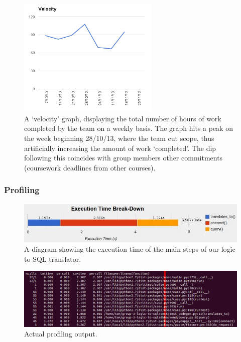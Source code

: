 \documentclass[a4paper, 11pt]{article}
\begin{document}
    \begin{figure}[H]
      \centering
      \includegraphics[width=0.6\textwidth]{images/velocity.png}
      \caption{A `velocity' graph, displaying the total number of hours of work
        completed by the team on a weekly basis. The graph hits a peak on the
        week beginning 28/10/13, where the team cut scope, thus artificially
        increasing the amount of work `completed'. The dip following this
        coincides with group members other commitments (coursework deadlines
        from other courses).}
      \end{figure}

  \subsubsection{Profiling}
     \begin{figure}[H]
        \includegraphics[width=1.0\textwidth]{images/1.jpg}
        \caption{A diagram showing the execution time of the main steps of our
        logic to SQL translator.}
      \end{figure} 

      \begin{figure}[H]
        \includegraphics[width=1.0\textwidth]{images/4.png}
        \caption{Actual profiling output.}
      \end{figure}
\end{document}
